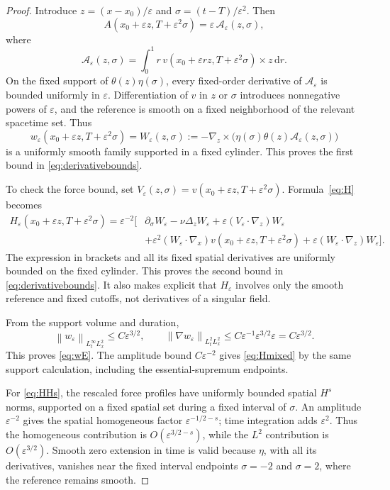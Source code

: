 \documentclass[11pt,a4paper]{article}
\theoremstyle{definition}\newtheorem{definition}[theorem]{Definition}
\theoremstyle{remark}\newtheorem{remark}[theorem]{Remark}
\newcommand{\dd}{\,\mathrm d}\newcommand{\eps}{\varepsilon}
\newcommand{\norm}[1]{\left\lVert#1\right\rVert}
\begin{document}
\begin{proof}
Introduce $z=(x-x_0)/\eps$ and $\sigma=(t-T)/\eps^2$. Then
\[
 A(x_0+\eps z,T+\eps^2\sigma)=\eps\,\mathcal A_\eps(z,\sigma),
\]
where
\[
 \mathcal A_\eps(z,\sigma)
 =\int_0^1r\,v(x_0+\eps rz,T+\eps^2\sigma)\times z\dd r.
\]
On the fixed support of $\theta(z)\eta(\sigma)$, every fixed-order derivative of $\mathcal A_\eps$ is bounded uniformly in $\eps$. Differentiation of $v$ in $z$ or $\sigma$ introduces nonnegative powers of $\eps$, and the reference is smooth on a fixed neighborhood of the relevant spacetime set. Thus
\[
 w_\eps(x_0+\eps z,T+\eps^2\sigma)
 =W_\eps(z,\sigma)
 :=-\nabla_z\times\bigl(\eta(\sigma)\theta(z)\mathcal A_\eps(z,\sigma)\bigr)
\]
is a uniformly smooth family supported in a fixed cylinder. This proves the first bound in \eqref{eq:derivativebounds}.

To check the force bound, set
$V_\eps(z,\sigma)=v(x_0+\eps z,T+\eps^2\sigma)$.
Formula~\eqref{eq:H} becomes
\begin{align*}
 H_\eps(x_0+\eps z,T+\eps^2\sigma)
 =\eps^{-2}\bigl[&
 \partial_\sigma W_\eps-\nu\Delta_zW_\eps
 +\eps(V_\eps\cdot\nabla_z)W_\eps\\
 &+\eps^2(W_\eps\cdot\nabla_x)v(x_0+\eps z,T+\eps^2\sigma)
 +\eps(W_\eps\cdot\nabla_z)W_\eps\bigr].
\end{align*}
The expression in brackets and all its fixed spatial derivatives are uniformly bounded on the fixed cylinder. This proves the second bound in \eqref{eq:derivativebounds}. It also makes explicit that $H_\eps$ involves only the smooth reference and fixed cutoffs, not derivatives of a singular field.

From the support volume and duration,
\[
 \norm{w_\eps}_{L^\infty_tL^2_x}\le C\eps^{3/2},\qquad
 \norm{\nabla w_\eps}_{L^2_tL^2_x}
 \le C\eps^{-1}\eps^{3/2}\eps=C\eps^{3/2}.
\]
This proves \eqref{eq:wE}. The amplitude bound $C\eps^{-2}$ gives
\eqref{eq:Hmixed} by the same support calculation, including the essential-supremum endpoints.

For \eqref{eq:HHs}, the rescaled force profiles have uniformly bounded spatial $H^s$ norms, supported on a fixed spatial set during a fixed interval of $\sigma$. An amplitude $\eps^{-2}$ gives the spatial homogeneous factor $\eps^{-1/2-s}$; time integration adds $\eps^2$. Thus the homogeneous contribution is $O(\eps^{3/2-s})$, while the $L^2$ contribution is $O(\eps^{3/2})$. Smooth zero extension in time is valid because $\eta$, with all its derivatives, vanishes near the fixed interval endpoints $\sigma=-2$ and $\sigma=2$, where the reference remains smooth.
\end{proof}
\end{document}
